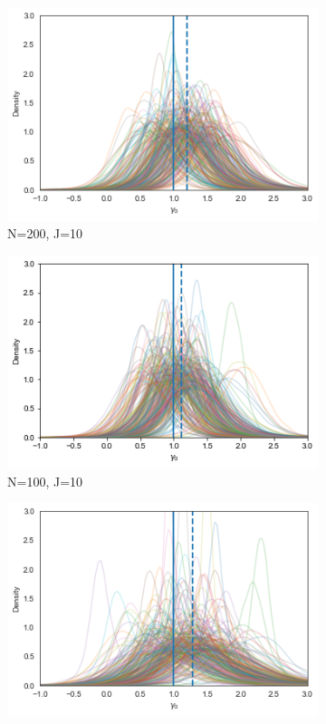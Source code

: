 \begin{figure}[h!]
  \centering
  \begin{subfigure}[b]{0.3\linewidth}
    \includegraphics[width=\linewidth]{graphics/posterior_plot_gamma0_wrong}
    \caption{ N=200, J=10}
  \end{subfigure}
  \begin{subfigure}[b]{0.3\linewidth}
    \includegraphics[width=\linewidth]{graphics/posterior_plot_gamma0_wrong_smallN}
    \caption{ N=100, J=10}
  \end{subfigure}
  \begin{subfigure}[b]{0.3\linewidth}
    \includegraphics[width=\linewidth]{graphics/posterior_plot_gamma0_wrong_smallJ}

\end{subfigure}
\end{figure}
